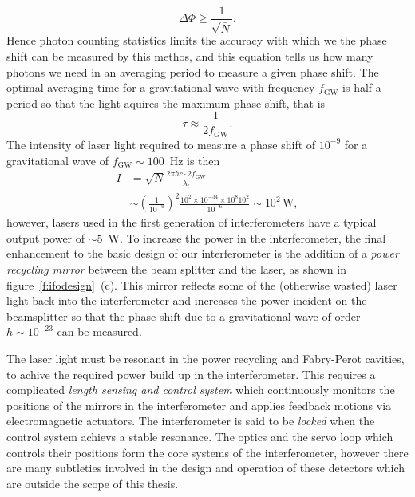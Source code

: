 \begin{equation}
\Delta \Phi \ge \frac{1}{\sqrt{\bar{N}}}.
\end{equation}
Hence photon counting statistics limits the accuracy with which we the phase
shift can be measured by this methos, and this equation tells us how many
photons we need in an averaging period to measure a given phase shift. The
optimal averaging time for a gravitational wave with frequency $f_\mathrm{GW}$
is half a period so that the light aquires the maximum phase shift, that is
\begin{equation}
\tau \approx \frac{1}{2 f_\mathrm{GW}}.
\end{equation}
The intensity of laser light required to measure a phase shift of $10^{-9}$
for a gravitational wave of $f_\mathrm{GW} \sim 100$~Hz is then
\begin{equation}
\begin{split}
I &= \sqrt{N} \frac{2 \pi \hbar c \cdot 2f_\mathrm{GW}}{\lambda_l} \\
&\sim \left(\frac{1}{10^{-9}}\right)^2 
\frac{10^2 \times 10^{-34} \times 10^{8} 10^2 } { 10^{-6} } \sim 10^2\,
\mathrm{W},
\end{split}
\end{equation}
however, lasers used in the first generation of interferometers have a typical
output power of $\sim 5$~W. To increase the power in the interferometer, the
final enhancement to the basic design of our interferometer is the addition of a
\emph{power recycling mirror} between the beam splitter and the laser, as
shown in figure~\ref{f:ifodesign}~(c). This mirror reflects some of the
(otherwise wasted) laser light back into the interferometer and increases the
power incident on the beamsplitter so that the phase shift due to a
gravitational wave of order $h \sim 10^{-23}$ can be measured.

The laser light must be resonant in the power recycling and Fabry-Perot
cavities, to achive the required power build up in the interferometer. This
requires a complicated \emph{length sensing and control
system}\cite{Fritschel:2001} which continuously monitors the positions of the
mirrors in the interferometer and applies feedback motions via electromagnetic
actuators. The interferometer is said to be \emph{locked} when the control
system achievs a stable resonance. The optics and the servo loop which
controls their positions form the core systems of the interferometer, however
there are many subtleties involved in the design and operation of these
detectors which are outside the scope of this thesis.

